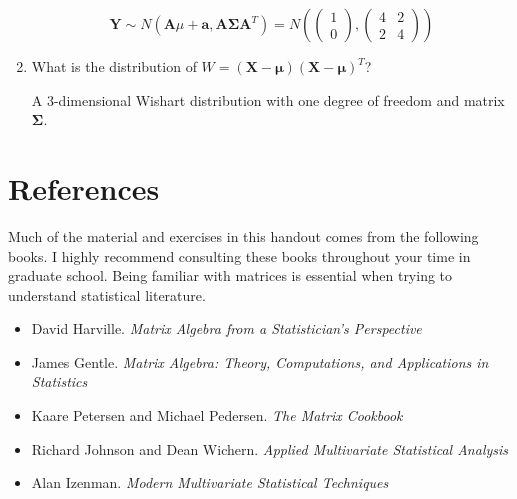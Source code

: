 \documentclass[11pt]{article}
\theoremstyle{definition}
\begin{document}
\begin{enumerate}
$$\mathbf{Y} \sim N(\mathbf{A}\mu + \mathbf{a}, \mathbf{A\Sigma A}^T) = N\left(  \begin{pmatrix}1 \\ 0 \end{pmatrix}, \begin{pmatrix}4 & 2\\2 & 4\end{pmatrix}\right) $$

\item What is the distribution of $W = (\mathbf{X - \mu})(\mathbf{X - \mu})^T$?

A 3-dimensional Wishart distribution with one degree of freedom and matrix $\mathbf{\Sigma}$.

\end{enumerate}

\section{References}
Much of the material and exercises in this handout comes from the following books.  I highly recommend consulting these books throughout your time in graduate school.  Being familiar with matrices is essential when trying to understand statistical literature.

\begin{itemize}
\item David Harville.  \textit{Matrix Algebra from a Statistician's Perspective}
\item James Gentle. \textit{Matrix Algebra: Theory, Computations, and Applications in Statistics}
\item Kaare Petersen and Michael Pedersen. \textit{The Matrix Cookbook}
\item Richard Johnson and Dean Wichern. \textit{Applied Multivariate Statistical Analysis}
\item Alan Izenman. \textit{Modern Multivariate Statistical Techniques}
\end{itemize}
\end{document}
